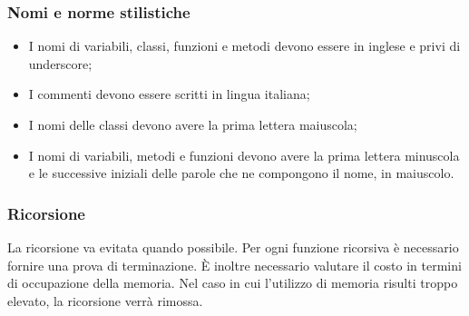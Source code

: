 \subsubsection{Nomi e norme stilistiche}
\begin{itemize}
	\item I nomi di variabili, classi, funzioni e metodi devono essere in inglese e privi di underscore;
	\item I commenti devono essere scritti in lingua italiana;
	\item I nomi delle classi devono avere la prima lettera maiuscola;
	\item I nomi di variabili, metodi e funzioni devono avere la prima lettera minuscola e le successive iniziali delle parole che ne compongono il nome, in maiuscolo.
\end{itemize}

\subsubsection{Ricorsione}
La ricorsione va evitata quando possibile. Per ogni funzione ricorsiva è necessario
fornire una prova di terminazione. È inoltre necessario valutare il costo in termini di
occupazione della memoria. Nel caso in cui l’utilizzo di memoria risulti troppo elevato, la ricorsione verrà rimossa.

